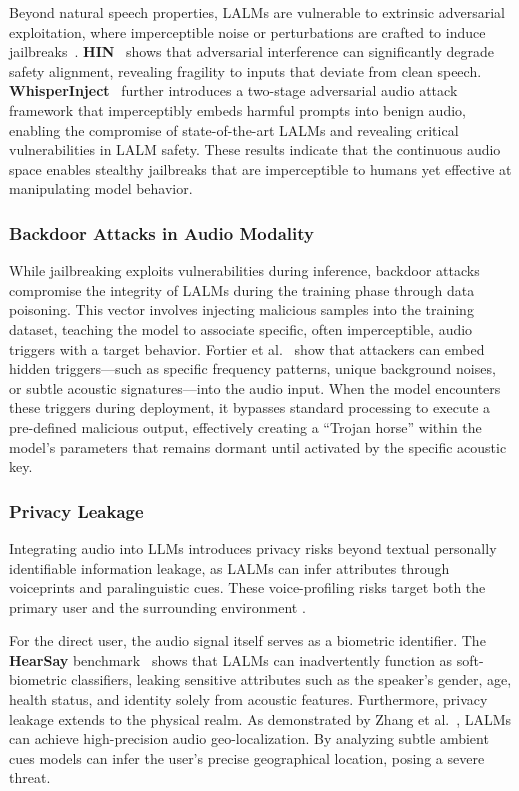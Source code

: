\documentclass{llmxive}
\begin{document}
Beyond natural speech properties, LALMs are vulnerable to extrinsic adversarial exploitation, where imperceptible noise or perturbations are crafted to induce jailbreaks~\cite{song2025audio}. \textbf{HIN}~\cite{lin2025hidden} shows that adversarial interference can significantly degrade safety alignment, revealing fragility to inputs that deviate from clean speech. \textbf{WhisperInject}~\cite{kim2025good} further introduces a two-stage adversarial audio attack framework that imperceptibly embeds harmful prompts into benign audio, enabling the compromise of state-of-the-art LALMs and revealing critical vulnerabilities in LALM safety.
These results indicate that the continuous audio space enables stealthy jailbreaks that are imperceptible to humans yet effective at manipulating model behavior.

\subsubsection{Backdoor Attacks in Audio Modality}

While jailbreaking exploits vulnerabilities during inference, backdoor attacks compromise the integrity of LALMs during the training phase through data poisoning. 
This vector involves injecting malicious samples into the training dataset, teaching the model to associate specific, often imperceptible, audio triggers with a target behavior. Fortier et al.~\cite{fortier2025backdoor} show that attackers can embed hidden triggers---such as specific frequency patterns, unique background noises, or subtle acoustic signatures—into the audio input. When the model encounters these triggers during deployment, it bypasses standard processing to execute a pre-defined malicious output, effectively creating a ``Trojan horse'' within the model's parameters that remains dormant until activated by the specific acoustic key.

\subsubsection{Privacy Leakage}
Integrating audio into LLMs introduces privacy risks beyond textual personally identifiable information leakage, as LALMs can infer attributes through voiceprints and paralinguistic cues. These voice-profiling risks target both the primary user and the surrounding environment \cite{zhan2025protecting}.

For the direct user, the audio signal itself serves as a biometric identifier. The \textbf{HearSay} benchmark~\cite{wang2026hearsay} shows that LALMs can inadvertently function as soft-biometric classifiers, leaking sensitive attributes such as the speaker's gender, age, health status, and identity solely from acoustic features. Furthermore, privacy leakage extends to the physical realm. As demonstrated by Zhang et al.~\cite{zhang2026sonar}, LALMs can achieve high-precision audio geo-localization. By analyzing subtle ambient cues models can infer the user’s precise geographical location, posing a severe threat.
\end{document}
